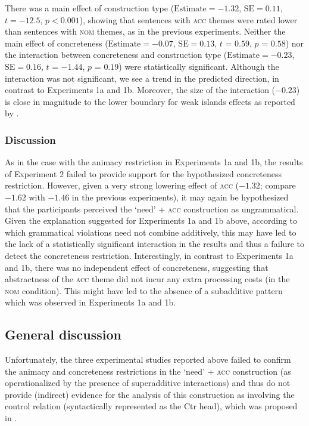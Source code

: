 \documentclass[output=paper]{langscibook}
\begin{document}
There was a main effect of construction type ($\text{Estimate} =-1.32$, $\text{SE} =0.11$, $t = -12.5$, $p < 0.001$), showing that sentences with \textsc{acc} themes were rated lower than sentences with \textsc{nom} themes, as in the previous experiments. Neither the main effect of concreteness ($\text{Estimate} =-0.07$, $\text{SE} =0.13$, $t$ = $0.59$, $p$ = $0.58$) nor the interaction between concreteness and construction type ($\text{Estimate} =-0.23$, $\text{SE} =0.16$, $t$ = $-1.44$, $p$ = $0.19$) were statistically significant. Although the interaction was not significant, we see a trend in the predicted direction, in contrast to Experiments 1a and 1b. Moreover, the size of the interaction ($-0.23$) is close in magnitude to the lower boundary for weak islands effects as reported by \citet{Kush.Lohndal.Sprouse2018}.

\subsubsection{Discussion}

As in the case with the animacy restriction in Experiments 1a and 1b, the results of Experiment 2 failed to provide support for the hypothesized concreteness restriction. However, given a very strong lowering effect of \textsc{acc} ($-1.32$; compare $-1.62$ with $-1.46$ in the previous experiments), it may again be hypothesized that the participants perceived the `need' + \textsc{acc} construction as ungrammatical. Given the explanation suggested for Experiments 1a and 1b above, according to which grammatical violations need not combine additively, this may have led to the lack of a statistically significant interaction in the results and thus a failure to detect the concreteness restriction. Interestingly, in contrast to Experiments 1a and 1b, there was no independent effect of concreteness, suggesting that abstractness of the \textsc{acc} theme did not incur any extra processing costs (in the \textsc{nom} condition). This might have led to the absence of a subadditive pattern which was observed in Experiments 1a and 1b.

\subsection{General discussion}

Unfortunately, the three experimental studies reported above failed to confirm the animacy and concreteness restrictions in the `need' + \textsc{acc} construction (as operationalized by the presence of superadditive interactions) and thus do not provide (indirect) evidence for the analysis of this construction as involving the control relation (syntactically represented as the Ctr head), which was proposed in .
\end{document}
